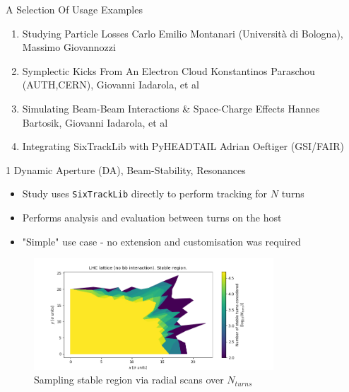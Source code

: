 \documentclass{beamer}
\begin{document}
\begin{frame}{A Selection Of Usage Examples}
\begin{enumerate}
    \item Studying Particle Losses\newline 
          Carlo Emilio Montanari (Università di Bologna), Massimo Giovannozzi
    \item Symplectic Kicks From An Electron Cloud\newline 
          Konstantinos Paraschou (AUTH,CERN), Giovanni Iadarola, et al
    \item Simulating Beam-Beam Interactions \& Space-Charge Effects\newline 
          Hannes Bartosik, Giovanni Iadarola, et al
    \item Integrating SixTrackLib with PyHEADTAIL\newline
          Adrian Oeftiger (GSI/FAIR)
        
\end{enumerate}
\end{frame}


\begin{frame}{1 Dynamic Aperture (DA), Beam-Stability, Resonances}
\begin{itemize}
    \item Study uses \texttt{SixTrackLib} directly to perform tracking for $N$ turns
    \item Performs analysis and evaluation between turns on the host 
    \item "Simple" use case - no extension and customisation was required
\end{itemize}
\begin{figure}[h]
    \includegraphics[width=0.8\textwidth]{carlo_emilio_figs/da_radial_scan.png}
    \centering 
    \caption{Sampling stable region via radial scans over $N_{turns}$}
\end{figure}

\end{frame}
\end{document}
